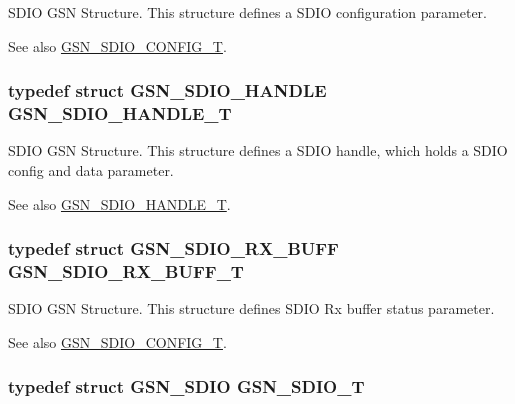 SDIO GSN Structure. This structure defines a SDIO configuration parameter. 

\begin{DoxySeeAlso}{See also}
\hyperlink{a00653_ga741fda4dc2cd93143a8a73ddaace7de8}{GSN\_\-SDIO\_\-CONFIG\_\-T}. 
\end{DoxySeeAlso}
\hypertarget{a00653_gaa50b5846f8905e5a7ab1cec63e6877a7}{
\subsubsection[{GSN\_\-SDIO\_\-HANDLE\_\-T}]{\setlength{\rightskip}{0pt plus 5cm}typedef struct {\bf GSN\_\-SDIO\_\-HANDLE} {\bf GSN\_\-SDIO\_\-HANDLE\_\-T}}}
\label{a00653_gaa50b5846f8905e5a7ab1cec63e6877a7}


SDIO GSN Structure. This structure defines a SDIO handle, which holds a SDIO config and data parameter. 

\begin{DoxySeeAlso}{See also}
\hyperlink{a00653_gaa50b5846f8905e5a7ab1cec63e6877a7}{GSN\_\-SDIO\_\-HANDLE\_\-T}. 
\end{DoxySeeAlso}
\hypertarget{a00653_ga3a7deb851a667b9d2a39d5e1509946ab}{
\subsubsection[{GSN\_\-SDIO\_\-RX\_\-BUFF\_\-T}]{\setlength{\rightskip}{0pt plus 5cm}typedef struct {\bf GSN\_\-SDIO\_\-RX\_\-BUFF}  {\bf GSN\_\-SDIO\_\-RX\_\-BUFF\_\-T}}}
\label{a00653_ga3a7deb851a667b9d2a39d5e1509946ab}


SDIO GSN Structure. This structure defines SDIO Rx buffer status parameter. 

\begin{DoxySeeAlso}{See also}
\hyperlink{a00653_ga741fda4dc2cd93143a8a73ddaace7de8}{GSN\_\-SDIO\_\-CONFIG\_\-T}. 
\end{DoxySeeAlso}
\hypertarget{a00653_gadc47bf5efb9097e51608305810d29895}{
\subsubsection[{GSN\_\-SDIO\_\-T}]{\setlength{\rightskip}{0pt plus 5cm}typedef struct {\bf GSN\_\-SDIO} {\bf GSN\_\-SDIO\_\-T}}}
\label{a00653_gadc47bf5efb9097e51608305810d29895}


